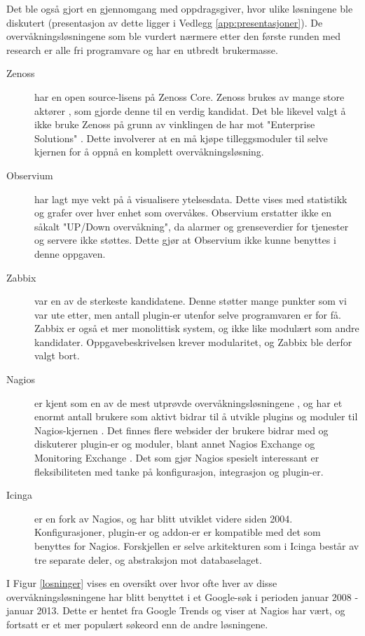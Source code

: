Det ble også gjort en gjennomgang med oppdragsgiver, hvor ulike løsningene ble diskutert (presentasjon av dette ligger i Vedlegg \ref{app:presentasjoner}). De overvåkningsløsningene som ble vurdert nærmere etter den første runden med research er alle fri programvare og har en utbredt brukermasse. 
\begin{description}
\item[Zenoss] har en open source-lisens på Zenoss Core. Zenoss brukes av mange store aktører \cite{zenoss}, som gjorde denne til en verdig kandidat. Det ble likevel valgt å ikke bruke Zenoss på grunn av vinklingen de har mot "Enterprise Solutions" \cite{zenpacks}. Dette involverer at en må kjøpe tilleggsmoduler til selve kjernen for å oppnå en komplett overvåkningsløsning.

\item[Observium] har lagt mye vekt på å visualisere ytelsesdata. Dette vises med statistikk og grafer over hver enhet som overvåkes. Observium erstatter ikke en såkalt "UP/Down overvåkning", da alarmer og grenseverdier for tjenester og servere ikke støttes\cite{observium}. Dette gjør at Observium ikke kunne benyttes i denne oppgaven.

\item[Zabbix]\cite{zabbix} var en av de sterkeste kandidatene. Denne støtter mange punkter som vi var ute etter, men antall plugin-er utenfor selve programvaren er for få. Zabbix er også et mer monolittisk system, og ikke like modulært som andre kandidater\cite{zabbixandnagios}. Oppgavebeskrivelsen krever modularitet, og Zabbix ble derfor valgt bort. 

\item[Nagios] er kjent som en av de mest utprøvde overvåkningsløsningene \cite{wiki:nagios} \cite{monitoringsetup} \cite{opensourcewatch} \cite{sectools}, og har et enormt antall brukere som aktivt bidrar til å utvikle plugins og moduler til Nagios-kjernen \cite{nagioscommunity}. Det finnes flere websider der brukere bidrar med og diskuterer plugin-er og moduler, blant annet Nagios Exchange \cite{nagiosexchange} og Monitoring Exchange \cite{monitoringexchange}. Det som gjør Nagios spesielt interessant er fleksibiliteten med tanke på konfigurasjon, integrasjon og plugin-er.

\item[Icinga] er en fork av Nagios, og har blitt utviklet videre siden 2004. Konfigurasjoner, plugin-er og addon-er er kompatible med det som benyttes for Nagios. Forskjellen er selve arkitekturen som i Icinga består av tre separate deler, og abstraksjon mot databaselaget. 
\end{description}
I Figur \ref{losninger} vises en oversikt over hvor ofte hver av disse overvåkningsløsningene har blitt benyttet i et Google-søk i perioden januar 2008 - januar 2013. Dette er hentet fra Google Trends og viser at Nagios har vært, og fortsatt er et mer populært søkeord enn de andre løsningene.

